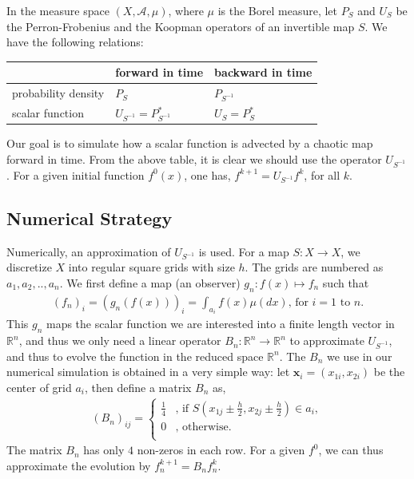 \documentclass[twocolumn,10pt]{asme2e}
\begin{document}
In the measure space $(X,\mathcal{A},\mu)$, where $\mu$ is the Borel
measure, let $P_S$ and $U_S$ be the Perron-Frobenius and the Koopman
operators of an invertible map $S$. We have the following relations:
\vspace{0.15cm}
\begin{center}
\begin{tabular}{l|ll}
\label{PUtable}
& forward in time
& backward in time
\\
\hline
probability density
& $P_S$
& $P_{S^{-1}}$
\\
scalar function
& $ U_{S^{-1}} = P_{S^{-1}}^* $
& $ U_S = P_S^*  $
\end{tabular}
\end{center}
\vspace{0.15cm} Our goal is to simulate how a scalar function is
advected by a chaotic map forward in time. From the above table, it is
clear we should use the operator $U_{S^{-1}}$. For a given initial
function $f^0(x)$, one has, $f^{k+1} = U_{S^{-1}} f^k$, for all $k$.

\subsection*{Numerical Strategy}

Numerically, an approximation of $U_{S^{-1}}$ is used. For a map $S: X \to X$, we discretize $X$ into regular square grids with size $h$. The grids are numbered as $a_1,a_2,.., a_{n}$. We first define a map (an observer) $g_n: f(x) \mapsto
f_n $ such that
\begin{eqnarray} 
  (f_n)_i = (g_n(f(x)))_i = \int_{a_i} f(x) \mu(dx) \mbox{, for }i = 1
  \mbox{ to } n.
\end{eqnarray}
This $g_n$ maps the scalar function we are interested into a finite
length vector in $\mathbb{R}^n$, and thus we only need a linear
operator $B_n:\mathbb{R}^n \to \mathbb{R}^n$ to approximate
$U_{S^{-1}}$, and thus to evolve the function in the reduced space
$\mathbb{R}^n$. The $B_n$ we use in our numerical simulation is
obtained in a very simple way: let $\mathbf{x}_i =(x_{1i},x_{2i})$ be
the center of grid $a_i$, then define a matrix $B_n$ as,
 \begin{eqnarray}
 \label{finegridmethod}
 (B_n)_{ij} = \begin{cases}
   \frac{1}{4} &\mbox{, if } S(x_{1j}\pm \frac{h}{2},x_{2j}\pm \frac{h}{2}) \in a_i, \\
   0           &\mbox{, otherwise}. \\
 \end{cases}
 \end{eqnarray}
The matrix $B_n$ has only $4$ non-zeros in each row. For a given
$f^0$, we can thus approximate the evolution by $f_n^{k+1} = B_n
f_n^k$.
\end{document}
